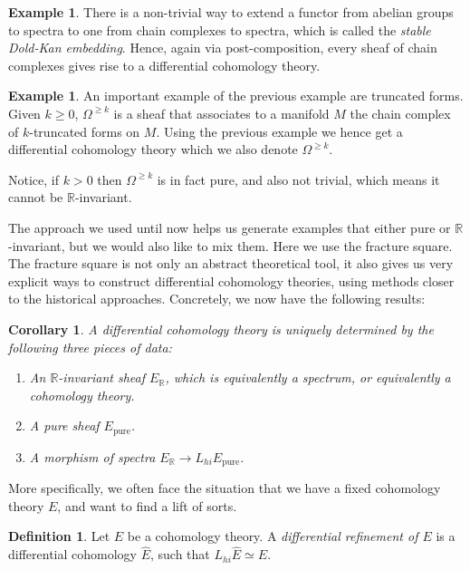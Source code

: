 \documentclass[a4paper]{book}
\newcommand{\bR}{\mathbb{R}}
\newtheorem{corollary}[equation]{Corollary}
\theoremstyle{definition}
\newtheorem{definition}[equation]{Definition}
\newtheorem{example}[equation]{Example}
\theoremstyle{remark}
\numberwithin{equation}{section}
\begin{document}
\begin{example}
  There is a non-trivial way to extend a functor from abelian groups to spectra to one from chain complexes to spectra, which is called the \emph{stable Dold-Kan embedding}. Hence, again via post-composition, every sheaf of chain complexes gives rise to a differential cohomology theory.
\end{example}

\begin{example}
 An important example of the previous example are truncated forms. Given $k \geq 0$, $\Omega^{\geq k}$ is a sheaf that associates to a manifold $M$ the chain complex of $k$-truncated forms on $M$. Using the previous example we hence get a differential cohomology theory which we also denote $\Omega^{\geq k }$.

 Notice, if $k > 0$ then $\Omega^{\geq k}$ is in fact pure, and also not trivial, which means it cannot be $\bR$-invariant.
\end{example}

The approach we used until now helps us generate examples that either pure or $\bR$-invariant, but we would also like to mix them. Here we use the fracture square. The fracture square is not only an abstract theoretical tool, it also gives us very explicit ways to construct differential cohomology theories, using methods closer to the historical approaches. Concretely, we now have the following results:

\begin{corollary}
  A differential cohomology theory is uniquely determined by the following three pieces of data:
  \begin{enumerate}
    \item An $\bR$-invariant sheaf $E_{\bR}$, which is equivalently a spectrum, or equivalently a cohomology theory.
    \item A pure sheaf $E_{\mathrm{pure}}$. 
    \item A morphism of spectra $E_{\bR} \to L_{hi}E_{\mathrm{pure}}$.
  \end{enumerate}
\end{corollary}

More specifically, we often face the situation that we have a fixed cohomology theory $E$, and want to find a lift of sorts.

\begin{definition}
  Let $E$ be a cohomology theory. A \emph{differential refinement of $E$} is a differential cohomology $\hat{E}$, such that $L_{hi}\hat{E} \simeq E$.
\end{definition}
\end{document}
